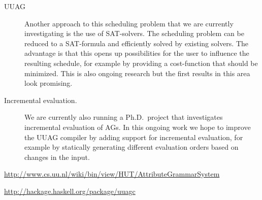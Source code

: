 \begin{hcarentry}[updated]{UUAG}
\begin{description}
Another approach to this scheduling problem that we are currently investigating is the use of SAT-solvers. The scheduling problem can be reduced to a SAT-formula and efficiently solved by existing solvers. The advantage is that this opens up possibilities for the user to influence the resulting schedule, for example by providing a cost-function that should be minimized. This is also ongoing research but the first results in this area look promising.

\item[Incremental evaluation.]
  We are currently also running a Ph.D.\ project that investigates incremental evaluation of
  AGs. In this ongoing work we hope to improve the UUAG compiler by adding support for
  incremental evaluation, for example by statically generating different evaluation orders
  based on changes in the input.
\end{description}

\FurtherReading
\begin{compactitem}
\item
  \url{http://www.cs.uu.nl/wiki/bin/view/HUT/AttributeGrammarSystem}
\item
  \url{http://hackage.haskell.org/package/uuagc}
\end{compactitem}
\end{hcarentry}
